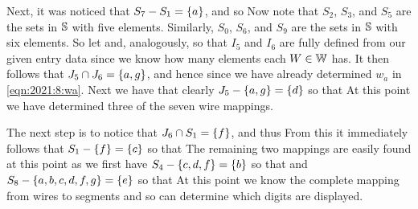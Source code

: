\documentclass{article}
\begin{document}
{    Next, it was noticed that $S_7 - S_1 = \left\{ a \right\}$, and so
    Now note that $S_2$, $S_3$, and $S_5$ are the sets in $\mathbb{S}$ with five elements.
    Similarly, $S_0$, $S_6$, and $S_9$ are the sets in $\mathbb{S}$ with six elements.
    So let
    and, analogously,
    so that $I_5$ and $I_6$ are fully defined from our given entry data since we know how many elements each $W \in \mathbb{W}$ has.
    It then follows that $J_5 \cap J_6 = \left\{ a, g \right\}$, and hence
    since we have already determined $w_a$ in \eqref{eqn:2021:8:wa}.
    Next we have that clearly $J_5 - \left\{ a, g \right\} = \left\{ d \right\}$ so that
    At this point we have determined three of the seven wire mappings.

    The next step is to notice that $J_6 \cap S_1 = \left\{ f \right\}$, and thus
    From this it immediately follows that $S_1 - \left\{ f \right\} = \left\{ c \right\}$ so that
    The remaining two mappings are easily found at this point as we first have $S_4 - \left\{ c, d, f \right\} = \left\{ b \right\}$ so that
    and $S_8 - \left\{ a, b, c, d, f, g \right\} = \left\{ e \right\}$ so that
    At this point we know the complete mapping from wires to segments and so can determine which digits are displayed.
}

\end{document}
